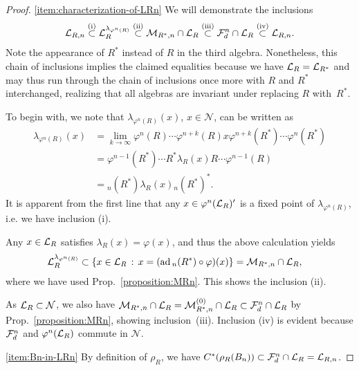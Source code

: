 \documentclass[12pt,a4paper]{amsart}
\numberwithin{equation}{section}
\theoremstyle{remark}
\DeclareMathOperator{\ad}{ad}
\newcommand{\la}{\lambda}
\newcommand{\CM}[0]{\mathcal{M}} \newcommand{\CN}[0]{\mathcal{N}}
\begin{document}
\begin{proof}
    \ref{item:characterization-of-LRn} We will demonstrate the inclusions
    \begin{align*}
        \CL_{R,n}
        \stackrel{\text{(i)}}{\subset}
        \CL_R^{\la_{\varphi^n(R)}}
        \stackrel{\text{(ii)}}{\subset}
        \CM_{R^*,n}\cap\CL_R
        \stackrel{\text{(iii)}}{\subset}
        \CF_d^n\cap\CL_R
        \stackrel{\text{(iv)}}{\subset}
        \CL_{R,n}
        .
    \end{align*}
    Note the appearance of ${R^*}$ instead of $R$ in the third algebra. Nonetheless, this chain of inclusions implies the claimed equalities because we have $\mathcal{L}_R=\mathcal{L}_{R^*}$ and may thus run through the chain of inclusions once more with $R$ and $R^*$ interchanged, realizing that all algebras are invariant under replacing $R$ with~$R^*$.
    
    To begin with, we note that $\la_{\varphi^n(R)}(x)$, $x\in\CN$, can be written as
    \begin{align*}
        \la_{\varphi^n(R)}(x)
        &=
        \lim_{k\to\infty}\varphi^n(R)\cdots\varphi^{n+k}(R)x\varphi^{n+k}(R^*)\cdots\varphi^n(R^*)
        \\
        &=
        \varphi^{n-1}(R^*)\cdots R^*\la_R(x)R\cdots\varphi^{n-1}(R)
        \\
        &=
        {}_n(R^*)\la_R(x){}_n(R^*)^*.        
    \end{align*}
    It is apparent from the first line that any $x\in\varphi^n(\mathcal{L}_R)'$ is a fixed point of $\la_{\varphi^n(R)}$, i.e. we have inclusion (i). 

    Any $x\in\mathcal{L}_R$ satisfies $\la_R(x)=\varphi(x)$, and thus the above calculation yields
    \begin{align*}
        \CL_R^{\la_{\varphi^n(R)}}
        &\subset
        \{x\in\CL_R\,:\,x=(\ad {}_n(R^*)\circ\varphi)(x)\}
        =
        \CM_{R^*,n}\cap\CL_R,
    \end{align*}
	where we have used Prop.~\ref{proposition:MRn}. This shows the inclusion (ii).
	
	As $\CL_R\subset\CN$, we also have $\CM_{R^*,n}\cap\CL_R=\CM_{R^*,n}^{(0)}\cap\CL_R\subset\CF_d^n\cap\CL_R$ by Prop.~\ref{proposition:MRn}, showing inclusion~(iii). Inclusion (iv) is evident because $\mathcal{F}_d^n$ and $\varphi^n(\mathcal{L}_R)$ commute in $\CN$.

	\ref{item:Bn-in-LRn} By definition of $\rho_R$, we have $C^*(\rho_R(B_n))\subset\mathcal{F}_d^n\cap\mathcal{L}_R=\mathcal{L}_{R,n}$.
\end{proof}
\end{document}
